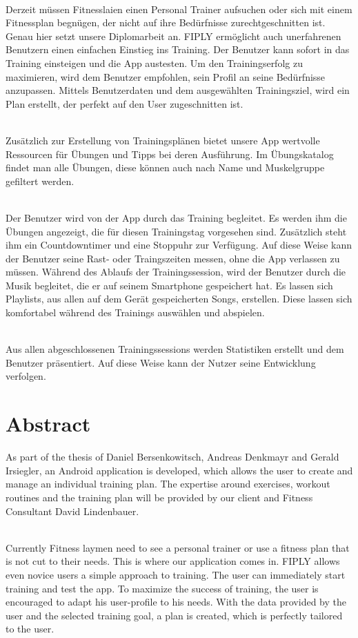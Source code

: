 \documentclass[FIPLY_base.tex]{subfiles}
\begin{document}
\ \\
Derzeit müssen Fitnesslaien einen Personal Trainer aufsuchen oder sich mit einem Fitnessplan begnügen, der nicht auf ihre Bedürfnisse zurechtgeschnitten ist. Genau hier setzt unsere Diplomarbeit an. FIPLY ermöglicht auch unerfahrenen Benutzern einen einfachen Einstieg ins Training. Der Benutzer kann sofort in das Training einsteigen und die App austesten.
Um den Trainingserfolg zu maximieren, wird dem Benutzer empfohlen, sein Profil an seine Bedürfnisse anzupassen.
Mittels Benutzerdaten und dem ausgewählten Trainingsziel, wird ein Plan erstellt, der perfekt auf den User zugeschnitten ist.

\ \\
Zusätzlich zur Erstellung von Trainingsplänen bietet unsere App wertvolle Ressourcen für Übungen und Tipps bei deren Ausführung. Im Übungskatalog findet man alle Übungen, diese können auch nach Name und Muskelgruppe gefiltert werden.

\ \\
Der Benutzer wird von der App durch das Training begleitet. Es werden ihm die Übungen angezeigt, die für diesen Trainingstag vorgesehen sind. Zusätzlich steht ihm ein Countdowntimer und eine Stoppuhr zur Verfügung. Auf diese Weise kann der Benutzer seine Rast- oder Traingszeiten messen, ohne die App verlassen zu müssen.  
Während des Ablaufs der Trainingssession, wird der Benutzer durch die Musik begleitet, die er auf seinem Smartphone gespeichert hat.
Es lassen sich Playlists, aus allen auf dem Gerät gespeicherten Songs, erstellen. Diese lassen sich komfortabel während des Trainings auswählen und abspielen.

\ \\
Aus allen abgeschlossenen Trainingssessions werden Statistiken erstellt und dem Benutzer präsentiert.
Auf diese Weise kann der Nutzer seine Entwicklung verfolgen. 




\section{Abstract}
As part of the thesis of Daniel Bersenkowitsch, Andreas Denkmayr and Gerald Irsiegler, an Android application is developed, which allows the user to create and manage an individual training plan.
The expertise around exercises, workout routines and the training plan will be provided by our client and Fitness Consultant David Lindenbauer.

\ \\
Currently Fitness laymen need to see a personal trainer or use a fitness plan that is not cut to their needs. This is where our application comes in. FIPLY allows even novice users a simple approach to training. The user can immediately start training and test the app.
To maximize the success of training, the user is encouraged to adapt his user-profile to his needs.
With the data provided by the user and the selected training goal, a plan is created, which is perfectly tailored to the user.
\end{document}
